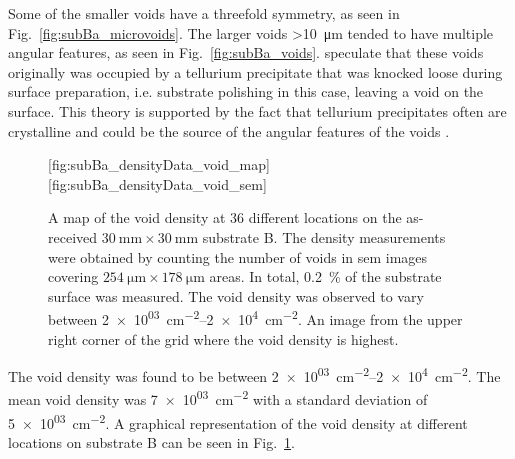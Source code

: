 Some of the smaller voids have a threefold symmetry, as seen in Fig.~\ref{fig:subBa_microvoids}. The larger voids \SI{>10}{\micro\metre} tended to have multiple angular features, as seen in Fig.~\ref{fig:subBa_voids}. \citet{reddy2013cross} speculate that these voids originally was occupied by a tellurium precipitate that was knocked loose during surface preparation, i.e. substrate polishing in this case, leaving a void on the surface. This theory is supported by the fact that tellurium precipitates often are crystalline and could be the source of the angular features of the voids \citep{wang2008observation}.

\begin{figure}[htbp]
    \centering
        [fig:subBa_densityData_void_map]
        \hfill
        [fig:subBa_densityData_void_sem]
    \caption[Map of the void density on the as-received substrate B.]{ A map of the void density at 36 different locations on the as-received $\SI{30}{\milli\metre}\times\SI{30}{\milli\metre}$ substrate B. The density measurements were obtained by counting the number of voids in \ac{sem} images covering $\SI{254}{\micro\metre}\times\SI{178}{\micro\metre}$ areas. In total, \SI{0.2}{\percent} of the substrate surface was measured. The void density was observed to vary between \SIrange{2e+03}{2e+4}{\centi\metre^{-2}}.  An image from the upper right corner of the grid where the void density is highest.}
    \label{fig:subBa_densityData_voids}
\end{figure}

The void density was found to be between \SIrange{2e+03}{2e+4}{\centi\metre^{-2}}. The mean void density was \SI{7e+03}{\centi\metre^{-2}} with a standard deviation of \SI{5e+03}{\centi\metre^{-2}}. A graphical representation of the void density at different locations on substrate B can be seen in Fig.~\ref{fig:subBa_densityData_voids}.

